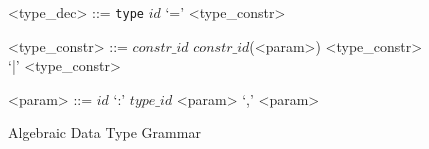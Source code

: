 \begin{figure}
\begin{grammar}
<type_dec> ::= \verb|type| $id$ `=' <type_constr>

<type_constr> ::= $constr\_id$
\alt $constr\_id$(<param>)
\alt <type_constr> `|' <type_constr>

<param> ::= $id$ `:' $type\_id$
\alt <param> `,' <param>

\end{grammar}
\hrulefill
\caption{Algebraic Data Type Grammar}
\end{figure}